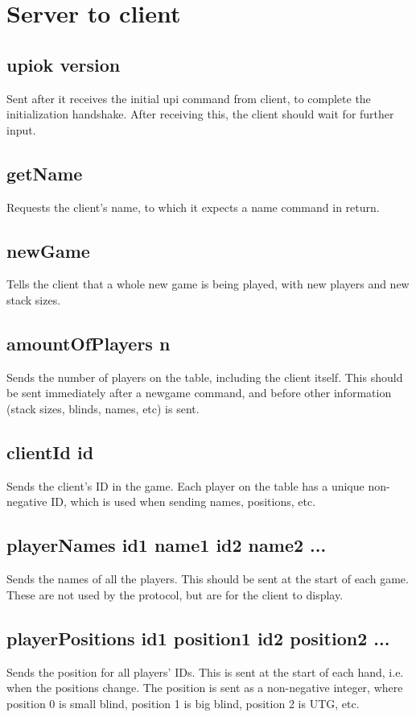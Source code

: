 \documentclass{article}
\begin{document}
\section{Server to client}

\subsection*{upiok \textlangle{}version\textrangle{}}
Sent after it receives the initial upi command from client, to complete the initialization handshake. After receiving this, the client should wait for further input.

\subsection*{getName}
Requests the client's name, to which it expects a name command in return.

\subsection*{newGame}
Tells the client that a whole new game is being played, with new players and new stack sizes. 

\subsection*{amountOfPlayers \textlangle{}n\textrangle{}}
Sends the number of players on the table, including the client itself. This should be sent immediately after a newgame command, and before other information (stack sizes, blinds, names, etc) is sent.

\subsection*{clientId \textlangle{}id\textrangle{}}
Sends the client's ID in the game. Each player on the table has a unique non-negative ID, which is used when sending names, positions, etc.

\subsection*{playerNames \textlangle{}id1 name1\textrangle{} \textlangle{}id2 name2\textrangle{} ... }
Sends the names of all the players. This should be sent at the start of each game. These are not used by the protocol, but are for the client to display.

\subsection*{playerPositions \textlangle{}id1 position1\textrangle{} \textlangle{}id2 position2\textrangle{} ... }
Sends the position for all players' IDs. This is sent at the start of each hand, i.e. when the positions change. The position is sent as a non-negative integer, where position 0 is small blind, position 1 is big blind, position 2 is UTG, etc.
\end{document}
